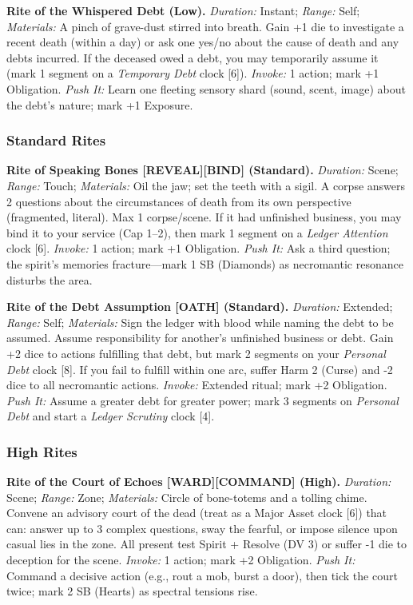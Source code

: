 \textbf{Rite of the Whispered Debt (Low).}  
\emph{Duration:} Instant; \emph{Range:} Self; \emph{Materials:} A pinch of grave-dust stirred into breath.  
Gain +1 die to investigate a recent death (within a day) or ask one yes/no about the cause of death and any debts incurred. If the deceased owed a debt, you may temporarily assume it (mark 1 segment on a \emph{Temporary Debt} clock [6]).  
\emph{Invoke:} 1 action; mark +1 Obligation.  
\emph{Push It:} Learn one fleeting sensory shard (sound, scent, image) about the debt’s nature; mark +1 Exposure.

\subsubsection*{Standard Rites}

\textbf{Rite of Speaking Bones [REVEAL][BIND] (Standard).}  
\emph{Duration:} Scene; \emph{Range:} Touch; \emph{Materials:} Oil the jaw; set the teeth with a sigil.  
A corpse answers 2 questions about the circumstances of death from its own perspective (fragmented, literal). Max 1 corpse/scene. If it had unfinished business, you may bind it to your service (Cap 1–2), then mark 1 segment on a \emph{Ledger Attention} clock [6].  
\emph{Invoke:} 1 action; mark +1 Obligation.  
\emph{Push It:} Ask a third question; the spirit’s memories fracture—mark 1 SB (Diamonds) as necromantic resonance disturbs the area.

\textbf{Rite of the Debt Assumption [OATH] (Standard).}  
\emph{Duration:} Extended; \emph{Range:} Self; \emph{Materials:} Sign the ledger with blood while naming the debt to be assumed.  
Assume responsibility for another’s unfinished business or debt. Gain +2 dice to actions fulfilling that debt, but mark 2 segments on your \emph{Personal Debt} clock [8]. If you fail to fulfill within one arc, suffer Harm 2 (Curse) and -2 dice to all necromantic actions.  
\emph{Invoke:} Extended ritual; mark +2 Obligation.  
\emph{Push It:} Assume a greater debt for greater power; mark 3 segments on \emph{Personal Debt} and start a \emph{Ledger Scrutiny} clock [4].

\subsubsection*{High Rites}

\textbf{Rite of the Court of Echoes [WARD][COMMAND] (High).}  
\emph{Duration:} Scene; \emph{Range:} Zone; \emph{Materials:} Circle of bone-totems and a tolling chime.  
Convene an advisory court of the dead (treat as a Major Asset clock [6]) that can: answer up to 3 complex questions, sway the fearful, or impose silence upon casual lies in the zone. All present test Spirit + Resolve (DV 3) or suffer -1 die to deception for the scene.  
\emph{Invoke:} 1 action; mark +2 Obligation.  
\emph{Push It:} Command a decisive action (e.g., rout a mob, burst a door), then tick the court twice; mark 2 SB (Hearts) as spectral tensions rise.

